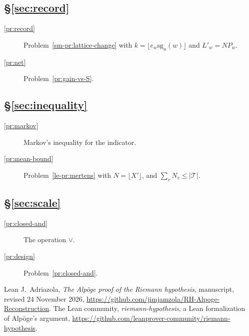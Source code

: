 \documentclass[reqno]{amsart}
\theoremstyle{definition}
\theoremstyle{plain}
\theoremstyle{remark}
\newcommand{\Tc}{\mathcal T}
\begin{document}
\subsection*{\S\ref{sec:record}}
\begin{description}
\item[\ref{pr:record}] Problem~\ref{sm-pr:lattice-change} with \(k=\lfloor e_w\mathrm{sg}_u(w)\rfloor\) and \(L'_w=N\!P_w\).
\item[\ref{pr:net}] Problem~\ref{pr:gain-vs-S}.
\end{description}

\subsection*{\S\ref{sec:inequality}}
\begin{description}
\item[\ref{pr:markov}] Markov's inequality for the indicator.
\item[\ref{pr:mean-bound}] Problem~\ref{le-pr:mertens} with \(N=\lfloor X'\rfloor\), and \(\sum_vN_v\le\lvert\Tc\rvert\).
\end{description}

\subsection*{\S\ref{sec:scale}}
\begin{description}
\item[\ref{pr:closed-and}] The operation \(\vee\).
\item[\ref{pr:design}] Problem~\ref{pr:closed-and}.
\end{description}

\begin{thebibliography}{Lean}
  J.~Adriazola, \emph{The Alp\"oge proof of the Riemann hypothesis}, manuscript, revised 24 November 2026, \url{https://github.com/jimjamzola/RH-Alpoge-Reconstruction}.
 The Lean community, \emph{riemann-hypothesis}, a Lean formalization of Alp\"oge's argument, \url{https://github.com/leanprover-community/riemann-hypothesis}.
\end{thebibliography}
\end{document}
